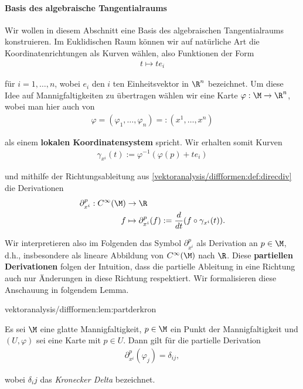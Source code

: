 \documentclass[letterpaper,10pt,english]{jupyterBook}
\begin{document}
\paragraph{Basis des algebraische Tangentialraums}
\label{\detokenize{vektoranalysis/diffformen:basis-des-algebraische-tangentialraums}}\label{\detokenize{vektoranalysis/diffformen:sec-tpbasis}}
\par
Wir wollen in diesem Abschnitt eine Basis des algebraischen Tangentialraums konstruieren.
Im Euklidischen Raum können wir auf natürliche Art die Koordinatenrichtungen als Kurven wählen, also Funktionen der Form
\begin{align*}
t \mapsto t e_i
\end{align*}
\par
für \(i=1,\ldots,n\), wobei \(e_i\) den \(i\) ten Einheitsvektor in \(\R^n\) bezeichnet.
Um diese Idee auf Mannigfaltigkeiten zu übertragen wählen wir eine Karte \(\varphi:\M\to\R^n\), wobei man hier auch von
\begin{align*}
\varphi = (\varphi_1,\ldots,\varphi_n) =: (x^1,\ldots,x^n)
\end{align*}
\par
als einem \textbf{lokalen Koordinatensystem} spricht.
Wir erhalten somit Kurven
\begin{align*}
\gamma_{x^i}(t):= \varphi^{-1}(\varphi(p) + t e_i)
\end{align*}
\par
und mithilfe der Richtungsableitung aus \cref{vektoranalysis/diffformen:def:direcdiv} die Derivationen
\begin{align*}
\partial_{x^i}^p: C^\infty(\M) &\to \R\\
f &\mapsto \partial_{x^i}^p(f) := \frac{d}{dt} (f\circ \gamma_{x^i}(t)).
\end{align*}
\par
Wir interpretieren also im Folgenden das Symbol \(\partial_{x^{i}}^p\) als Derivation an \(p\in\M\), d.h., insbesondere als lineare Abbildung von \(C^\infty(\M)\) nach \(\R\).
Diese \textbf{partiellen Derivationen} folgen der Intuition, dass die partielle Ableitung in eine Richtung auch nur Änderungen in diese Richtung respektiert.
Wir formalisieren diese Anschauung in folgendem Lemma.
\begin{lemma}{}{vektoranalysis/diffformen:lem:partderkron}



\par
Es sei \(\M\) eine glatte Mannigfaltigkeit, \(p\in\M\) ein Punkt der Mannigfaltigkeit und \((U,\varphi)\) sei eine Karte mit \(p\in U\).
Dann gilt für die partielle Derivation
\begin{align*}
\partial_{x^i}^p(\varphi_j) = \delta_{ij},
\end{align*}
\par
wobei \(\delta_ij\) das \emph{Kronecker Delta} bezeichnet.
\end{lemma}
\end{document}
